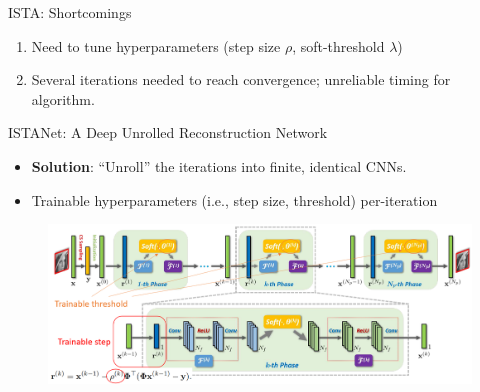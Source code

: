 \documentclass{beamer}
\begin{document}
  \begin{frame}{ISTA: Shortcomings}
    \begin{enumerate}
      \item Need to tune hyperparameters (step size $\rho$, soft-threshold $\lambda$)
      \item Several iterations needed to reach convergence; unreliable timing for algorithm.
    \end{enumerate}
  \end{frame}

  \begin{frame}{ISTANet: A Deep Unrolled Reconstruction Network}
    \begin{itemize}
      \item \textbf{Solution}: ``Unroll'' the iterations into finite, identical CNNs.
      \item Trainable hyperparameters (i.e., step size, threshold) per-iteration
    \end{itemize}
    \begin{figure}[htb]
      \centering
      \includegraphics[width=.8\linewidth]{istanet-annotated.png}
    \end{figure}
  \end{frame}
\end{document}
